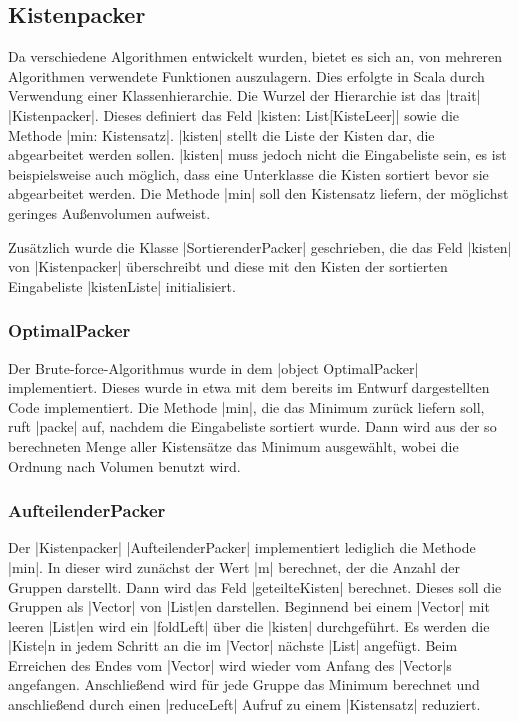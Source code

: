 \subsection{Kistenpacker}
Da verschiedene Algorithmen entwickelt wurden, bietet es sich an, von mehreren Algorithmen verwendete Funktionen auszulagern.
Dies erfolgte in Scala durch Verwendung einer Klassenhierarchie.
Die Wurzel der Hierarchie ist das |trait| |Kistenpacker|. Dieses definiert das Feld |kisten: List[KisteLeer]| sowie die Methode |min: Kistensatz|.
|kisten| stellt die Liste der Kisten dar, die abgearbeitet werden sollen.
|kisten| muss jedoch nicht die Eingabeliste sein, es ist beispielsweise auch möglich, dass eine Unterklasse die Kisten sortiert bevor sie abgearbeitet werden.
Die Methode |min| soll den Kistensatz liefern, der möglichst geringes Außenvolumen aufweist.

Zusätzlich wurde die Klasse |SortierenderPacker| geschrieben,
  die das Feld |kisten| von |Kistenpacker| überschreibt und diese mit den Kisten der sortierten Eingabeliste |kistenListe| initialisiert.
\subsubsection{OptimalPacker}
Der Brute-force-Algorithmus wurde in dem |object OptimalPacker| implementiert.
Dieses wurde in etwa mit dem bereits im Entwurf dargestellten Code implementiert.
Die Methode |min|, die das Minimum zurück liefern soll, ruft |packe| auf, nachdem die Eingabeliste sortiert wurde.
Dann wird aus der so berechneten Menge aller Kistensätze das Minimum ausgewählt, wobei die Ordnung nach Volumen benutzt wird.
\subsubsection{AufteilenderPacker}
Der |Kistenpacker| |AufteilenderPacker| implementiert lediglich die Methode |min|.
In dieser wird zunächst der Wert |m| berechnet, der die Anzahl der Gruppen darstellt.
Dann wird das Feld |geteilteKisten| berechnet. Dieses soll die Gruppen als |Vector| von |List|en darstellen.
Beginnend bei einem |Vector| mit leeren |List|en wird ein |foldLeft| über die |kisten| durchgeführt.
Es werden die |Kiste|n in jedem Schritt an die im |Vector| nächste |List| angefügt.
Beim Erreichen des Endes vom |Vector| wird wieder vom Anfang des |Vector|s angefangen.
Anschließend wird für jede Gruppe das Minimum berechnet und anschließend durch einen |reduceLeft| Aufruf zu einem |Kistensatz| reduziert.
